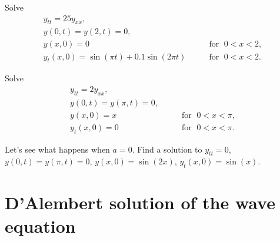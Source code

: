 \documentclass[12pt]{book}
\begin{document}
\begin{exercise}
Solve
\begin{equation*}
\begin{array}{ll}
y_{tt} = 25 y_{xx} , &  \\
y(0,t) = y(2,t) = 0 , &  \\
y(x,0) = 0 & \qquad \text{for } \; 0 < x < 2 , \\
y_t(x,0) = \sin(\pi t) + 0.1 \sin(2\pi t) & \qquad \text{for } \; 0 < x < 2 .
\end{array}
\end{equation*}
\end{exercise}

\begin{exercise}
Solve
\begin{equation*}
\begin{array}{ll}
y_{tt} = 2 y_{xx} , &  \\
y(0,t) = y(\pi,t) = 0 , &  \\
y(x,0) = x & \qquad \text{for } \; 0 < x < \pi , \\
y_t(x,0) = 0 & \qquad \text{for } \; 0 < x < \pi .
\end{array}
\end{equation*}
\end{exercise}
\exsol{%
$
y(x,t)
=
\sum\limits_{n=1}^\infty
\frac{2{(-1)}^{n+1}}{n} \,
\sin(nx) \,
\cos( n \sqrt{2}\,t ) 
$
}

\begin{exercise}
Let's see what happens when $a=0$.  Find a solution to
$y_{tt} = 0$, $y(0,t) = y(\pi,t) = 0$,
$y(x,0) = \sin(2x)$,
$y_t(x,0) = \sin(x)$.
\end{exercise}


\sectionnewpage
\section{D'Alembert solution of the wave equation}
\end{document}
